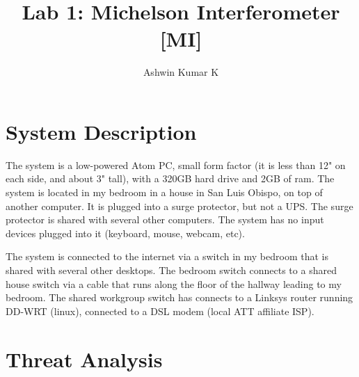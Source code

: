 \documentclass[11pt]{article}
\begin{document}
\author{Ashwin Kumar K}
\title{Lab 1: Michelson Interferometer [MI]}
\maketitle

\section{System Description}

The system is a low-powered Atom PC, small form factor 
(it is less than 12" on each side, and about 3" tall), 
with a 320GB hard drive and 2GB of ram.  
The system is located in my bedroom in a house in San Luis Obispo, 
on top of another computer.  It is plugged into a surge protector, 
but not a UPS.  The surge protector is shared with several other computers.
The system has no input devices plugged into it 
(keyboard, mouse, webcam, etc).

The system is connected to the internet via a switch in my bedroom 
that is shared with several other desktops. The bedroom switch connects 
to a shared house switch via a cable that runs along the floor of 
the hallway leading to my bedroom.  The shared workgroup switch 
has connects to a Linksys router running DD-WRT (linux), connected to 
a DSL modem (local ATT affiliate ISP).

\section{Threat Analysis}
\end{document}
